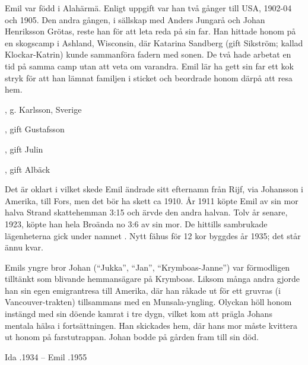 
Emil var född i Alahärmä. Enligt uppgift var han två gånger till USA, 1902-04 och 1905. Den andra gången, i sällskap med Anders Jungarå och Johan Henriksson Grötas, reste han för att leta reda på sin far. Han hittade honom på en skogscamp i Ashland, Wisconsin, där Katarina Sandberg (gift Sikström; kallad Klockar-Katrin) kunde sammanföra fadern med	sonen. De två hade arbetat en tid på samma camp utan att veta om varandra. Emil lär ha gett sin far ett kok stryk för att han lämnat familjen i sticket och beordrade honom därpå att resa hem.
\begin{jhchildren}
  \item {}, g. Karlsson, Sverige
  \item {}, gift Gustafsson
  \item {}, gift Julin
  \item {}
  \item {}, gift Albäck
\end{jhchildren}
Det är oklart i vilket skede Emil ändrade sitt efternamn från Rijf, via Johansson i Amerika, till Fors, men det bör ha skett ca 1910. År 1911 köpte Emil av sin mor halva Strand skattehemman 3:15 och ärvde den andra halvan. Tolv år senare, 1923, köpte han hela Broända no 3:6 av sin mor. De hittills sambrukade lägenheterna gick under namnet . Nytt fähus för 12 kor byggdes år 1935; det står ännu kvar.

Emils yngre bror Johan (``Jukka'', ``Jan'', ``Krymboas-Janne'') var	förmodligen tilltänkt som blivande hemmansägare på Krymboas. Liksom många andra gjorde han sin egen emigrantresa till Amerika, där han råkade ut för ett gruvras (i Vancouver-trakten) tillsammans med en Munsala-yngling. Olyckan höll honom instängd med sin döende kamrat i tre dygn, vilket kom att prägla Johans mentala hälsa i fortsättningen. Han skickades hem, där hans mor måste kvittera ut honom på farstutrappan. Johan bodde på gården fram till sin död.

Ida .1934  --	Emil .1955


